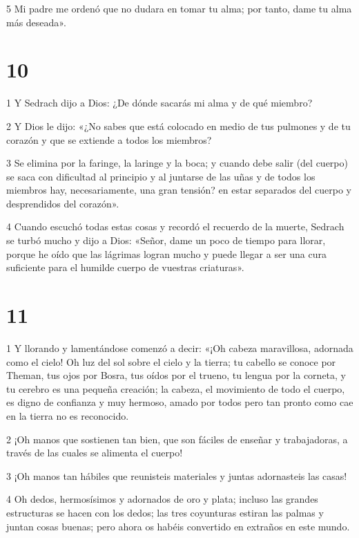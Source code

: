 \par 5 Mi padre me ordenó que no dudara en tomar tu alma; por tanto, dame tu alma más deseada».

\chapter{10}

\par 1 Y Sedrach dijo a Dios: ¿De dónde sacarás mi alma y de qué miembro?

\par 2 Y Dios le dijo: «¿No sabes que está colocado en medio de tus pulmones y de tu corazón y que se extiende a todos los miembros?

\par 3 Se elimina por la faringe, la laringe y la boca; y cuando debe salir (del cuerpo) se saca con dificultad al principio y al juntarse de las uñas y de todos los miembros hay, necesariamente, una gran tensión? en estar separados del cuerpo y desprendidos del corazón».

\par 4 Cuando escuchó todas estas cosas y recordó el recuerdo de la muerte, Sedrach se turbó mucho y dijo a Dios: «Señor, dame un poco de tiempo para llorar, porque he oído que las lágrimas logran mucho y puede llegar a ser una cura suficiente para el humilde cuerpo de vuestras criaturas».

\chapter{11}


\par 1 Y llorando y lamentándose comenzó a decir: «¡Oh cabeza maravillosa, adornada como el cielo! Oh luz del sol sobre el cielo y la tierra; tu cabello se conoce por Theman, tus ojos por Bosra, tus oídos por el trueno, tu lengua por la corneta, y tu cerebro es una pequeña creación; la cabeza, el movimiento de todo el cuerpo, es digno de confianza y muy hermoso, amado por todos pero tan pronto como cae en la tierra no es reconocido.

\par 2 ¡Oh manos que sostienen tan bien, que son fáciles de enseñar y trabajadoras, a través de las cuales se alimenta el cuerpo!

\par 3 ¡Oh manos tan hábiles que reunisteis materiales y juntas adornasteis las casas!

\par 4 Oh dedos, hermosísimos y adornados de oro y plata; incluso las grandes estructuras se hacen con los dedos; las tres coyunturas estiran las palmas y juntan cosas buenas; pero ahora os habéis convertido en extraños en este mundo.


